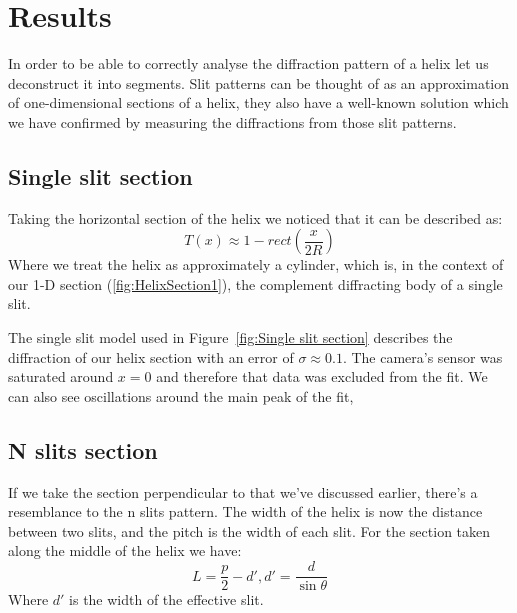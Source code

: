 \section{Results}\label{sec:results}
In order to be able to correctly analyse the diffraction pattern of a helix let us deconstruct it into segments.
Slit patterns can be thought of as an approximation of one-dimensional sections of a helix, they also have a well-known solution which we have confirmed by measuring the diffractions from those slit patterns.



\subsection{Single slit section}
Taking the horizontal section of the helix we noticed that it can be described as:
\[T(x)\approx 1-rect(\frac{x}{2R})\]
Where we treat the helix as approximately a cylinder, which is, in the context of our 1-D section (\ref{fig:HelixSection1}), the complement diffracting body of a single slit.

The single slit model used in Figure~\ref{fig:Single slit section} describes the diffraction of our helix section with an error of $\sigma\approx0.1$.
The camera's sensor was saturated around $x=0$ and therefore that data was excluded from the fit.
We can also see oscillations around the main peak of the fit,

\subsection{N slits section}
If we take the section perpendicular to that we've discussed earlier, there's a resemblance to the n slits pattern.
The width of the helix is now the distance between two slits, and the pitch is the width of each slit.
For the section taken along the middle of the helix we have: \[L=\frac{p}{2}-d',d'=\frac{d}{\sin \theta}\]
Where $d'$ is the width of the effective slit.


